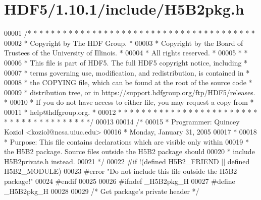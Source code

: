 \hypertarget{_h_d_f5_21_810_81_2include_2_h5_b2pkg_8h_source}{}\section{H\+D\+F5/1.10.1/include/\+H5\+B2pkg.h}
\label{_h_d_f5_21_810_81_2include_2_h5_b2pkg_8h_source}

\begin{DoxyCode}
00001 \textcolor{comment}{/* * * * * * * * * * * * * * * * * * * * * * * * * * * * * * * * * * * * * * *}
00002 \textcolor{comment}{ * Copyright by The HDF Group.                                               *}
00003 \textcolor{comment}{ * Copyright by the Board of Trustees of the University of Illinois.         *}
00004 \textcolor{comment}{ * All rights reserved.                                                      *}
00005 \textcolor{comment}{ *                                                                           *}
00006 \textcolor{comment}{ * This file is part of HDF5.  The full HDF5 copyright notice, including     *}
00007 \textcolor{comment}{ * terms governing use, modification, and redistribution, is contained in    *}
00008 \textcolor{comment}{ * the COPYING file, which can be found at the root of the source code       *}
00009 \textcolor{comment}{ * distribution tree, or in https://support.hdfgroup.org/ftp/HDF5/releases.  *}
00010 \textcolor{comment}{ * If you do not have access to either file, you may request a copy from     *}
00011 \textcolor{comment}{ * help@hdfgroup.org.                                                        *}
00012 \textcolor{comment}{ * * * * * * * * * * * * * * * * * * * * * * * * * * * * * * * * * * * * * * */}
00013 
00014 \textcolor{comment}{/*}
00015 \textcolor{comment}{ * Programmer:  Quincey Koziol <koziol@ncsa.uiuc.edu>}
00016 \textcolor{comment}{ *      Monday, January 31, 2005}
00017 \textcolor{comment}{ *}
00018 \textcolor{comment}{ * Purpose: This file contains declarations which are visible only within}
00019 \textcolor{comment}{ *      the H5B2 package.  Source files outside the H5B2 package should}
00020 \textcolor{comment}{ *      include H5B2private.h instead.}
00021 \textcolor{comment}{ */}
00022 \textcolor{preprocessor}{#if !(defined H5B2\_FRIEND || defined H5B2\_MODULE)}
00023 \textcolor{preprocessor}{#error "Do not include this file outside the H5B2 package!"}
00024 \textcolor{preprocessor}{#endif}
00025 
00026 \textcolor{preprocessor}{#ifndef \_H5B2pkg\_H}
00027 \textcolor{preprocessor}{#define \_H5B2pkg\_H}
00028 
00029 \textcolor{comment}{/* Get package's private header */}

\end{DoxyCode}
